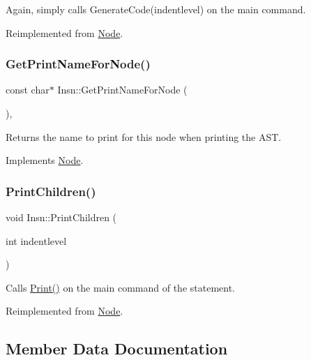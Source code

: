 Again, simply calls Generate\+Code(indentlevel) on the main command. 

Reimplemented from \hyperlink{class_node_acb60e526730e8436056375a3055c2c32}{Node}.

\mbox{\label{class_insn_ac78de59dd99944d8697853dc1c5634dc}} 
\subsubsection{\texorpdfstring{Get\+Print\+Name\+For\+Node()}{GetPrintNameForNode()}}
{\footnotesize\ttfamily const char$\ast$ Insn\+::\+Get\+Print\+Name\+For\+Node (\begin{DoxyParamCaption}{ }\end{DoxyParamCaption})\hspace{0.3cm}{\ttfamily [inline]}, {\ttfamily [virtual]}}

Returns the name to print for this node when printing the A\+ST. 

Implements \hyperlink{class_node_a56e29657306ffb004d69c6929ae44269}{Node}.

\mbox{\label{class_insn_aa0717beb7970d93fa733ffa41b7629ac}} 
\subsubsection{\texorpdfstring{Print\+Children()}{PrintChildren()}}
{\footnotesize\ttfamily void Insn\+::\+Print\+Children (\begin{DoxyParamCaption}\item[{int}]{indentlevel }\end{DoxyParamCaption})\hspace{0.3cm}{\ttfamily [virtual]}}

Calls \hyperlink{class_node_a9ef727fd72d1a37792b3db60a8a479dd}{Print()} on the main command of the statement. 

Reimplemented from \hyperlink{class_node_a3e67ec8d22182b721717af14fe0c3000}{Node}.



\subsection{Member Data Documentation}
\mbox{\label{class_insn_ab5605fe6decf9aa5a49aaa4b4674861a}} 
